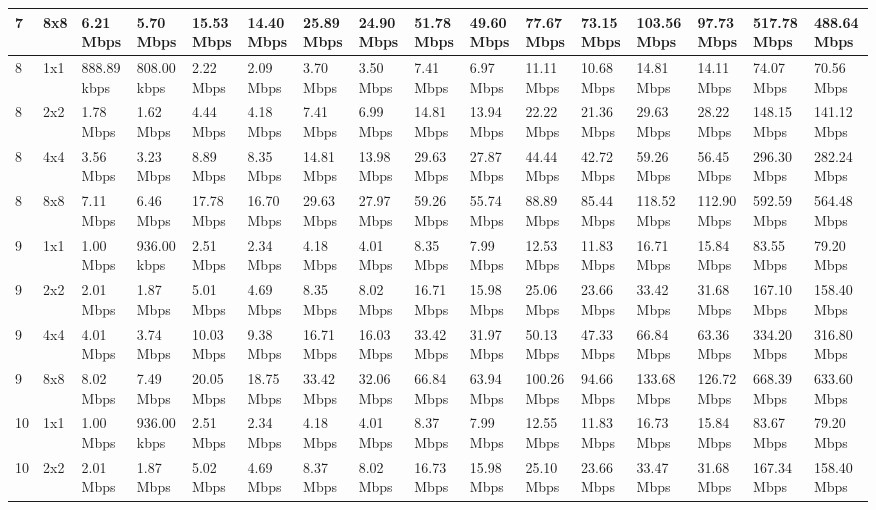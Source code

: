 \documentclass[12pt]{article}
\begin{document}
\begin{longtable}[c]{|l|l|l|l|l|l|l|l|l|l|l|l|l|l|l|l|}
7 & 8x8 & 6.21 Mbps & 5.70 Mbps & 15.53 Mbps & 14.40 Mbps & 25.89 Mbps & 24.90 Mbps & 51.78 Mbps & 49.60 Mbps & 77.67 Mbps & 73.15 Mbps & 103.56 Mbps & 97.73 Mbps & 517.78 Mbps & 488.64 Mbps \\ \hline
8 & 1x1 & 888.89 kbps & 808.00 kbps & 2.22 Mbps & 2.09 Mbps & 3.70 Mbps & 3.50 Mbps & 7.41 Mbps & 6.97 Mbps & 11.11 Mbps & 10.68 Mbps & 14.81 Mbps & 14.11 Mbps & 74.07 Mbps & 70.56 Mbps \\ \hline
8 & 2x2 & 1.78 Mbps & 1.62 Mbps & 4.44 Mbps & 4.18 Mbps & 7.41 Mbps & 6.99 Mbps & 14.81 Mbps & 13.94 Mbps & 22.22 Mbps & 21.36 Mbps & 29.63 Mbps & 28.22 Mbps & 148.15 Mbps & 141.12 Mbps \\ \hline
8 & 4x4 & 3.56 Mbps & 3.23 Mbps & 8.89 Mbps & 8.35 Mbps & 14.81 Mbps & 13.98 Mbps & 29.63 Mbps & 27.87 Mbps & 44.44 Mbps & 42.72 Mbps & 59.26 Mbps & 56.45 Mbps & 296.30 Mbps & 282.24 Mbps \\ \hline
8 & 8x8 & 7.11 Mbps & 6.46 Mbps & 17.78 Mbps & 16.70 Mbps & 29.63 Mbps & 27.97 Mbps & 59.26 Mbps & 55.74 Mbps & 88.89 Mbps & 85.44 Mbps & 118.52 Mbps & 112.90 Mbps & 592.59 Mbps & 564.48 Mbps \\ \hline
9 & 1x1 & 1.00 Mbps & 936.00 kbps & 2.51 Mbps & 2.34 Mbps & 4.18 Mbps & 4.01 Mbps & 8.35 Mbps & 7.99 Mbps & 12.53 Mbps & 11.83 Mbps & 16.71 Mbps & 15.84 Mbps & 83.55 Mbps & 79.20 Mbps \\ \hline
9 & 2x2 & 2.01 Mbps & 1.87 Mbps & 5.01 Mbps & 4.69 Mbps & 8.35 Mbps & 8.02 Mbps & 16.71 Mbps & 15.98 Mbps & 25.06 Mbps & 23.66 Mbps & 33.42 Mbps & 31.68 Mbps & 167.10 Mbps & 158.40 Mbps \\ \hline
9 & 4x4 & 4.01 Mbps & 3.74 Mbps & 10.03 Mbps & 9.38 Mbps & 16.71 Mbps & 16.03 Mbps & 33.42 Mbps & 31.97 Mbps & 50.13 Mbps & 47.33 Mbps & 66.84 Mbps & 63.36 Mbps & 334.20 Mbps & 316.80 Mbps \\ \hline
9 & 8x8 & 8.02 Mbps & 7.49 Mbps & 20.05 Mbps & 18.75 Mbps & 33.42 Mbps & 32.06 Mbps & 66.84 Mbps & 63.94 Mbps & 100.26 Mbps & 94.66 Mbps & 133.68 Mbps & 126.72 Mbps & 668.39 Mbps & 633.60 Mbps \\ \hline
10 & 1x1 & 1.00 Mbps & 936.00 kbps & 2.51 Mbps & 2.34 Mbps & 4.18 Mbps & 4.01 Mbps & 8.37 Mbps & 7.99 Mbps & 12.55 Mbps & 11.83 Mbps & 16.73 Mbps & 15.84 Mbps & 83.67 Mbps & 79.20 Mbps \\ \hline
10 & 2x2 & 2.01 Mbps & 1.87 Mbps & 5.02 Mbps & 4.69 Mbps & 8.37 Mbps & 8.02 Mbps & 16.73 Mbps & 15.98 Mbps & 25.10 Mbps & 23.66 Mbps & 33.47 Mbps & 31.68 Mbps & 167.34 Mbps & 158.40 Mbps \\ \hline

\end{longtable}
\end{document}

